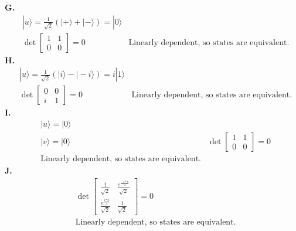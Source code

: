 \documentclass{article}
\def\ket#1{|#1\rangle}
\begin{document}
\textbf{G. }
\begin{align*}
&\ket{u} = \frac{1}{\sqrt{2}}(\ket{+}+\ket{-}) = \ket{0} \\
    &\det{\begin{bmatrix}
    1 & 1 \\ 0 & 0
    \end{bmatrix}} = 0   
    &\text{Linearly dependent, so states are equivalent.} 
\end{align*}
\textbf{H. }
\begin{align*}
&\ket{u} = \frac{1}{\sqrt{2}}(\ket{i}-\ket{-i}) = i\ket{1} \\
    &\det{\begin{bmatrix}
    0 & 0 \\ i & 1
    \end{bmatrix}} = 0   
    &\text{Linearly dependent, so states are equivalent.} 
\end{align*}
\textbf{I. }
\begin{align*}
&\ket{u} = \ket{0} \\
&\ket{v} = \ket{0}
    &\det{\begin{bmatrix}
    1 & 1 \\ 0 & 0
    \end{bmatrix}} = 0   \\
    &\text{Linearly dependent, so states are equivalent.} 
\end{align*}
\textbf{J. }
\begin{align*}
    &\det{\begin{bmatrix}
    \frac{1}{\sqrt{2}} & \frac{e^{\frac{-i*\pi}{4}}}{\sqrt{2}} \\ \frac{e^{\frac{i*\pi}{4}}}{\sqrt{2}} & \frac{1}{\sqrt{2}}
    \end{bmatrix}} = 0 \\
    &\text{Linearly dependent, so states are equivalent.} 
\end{align*}
\\
\\
\end{document}
